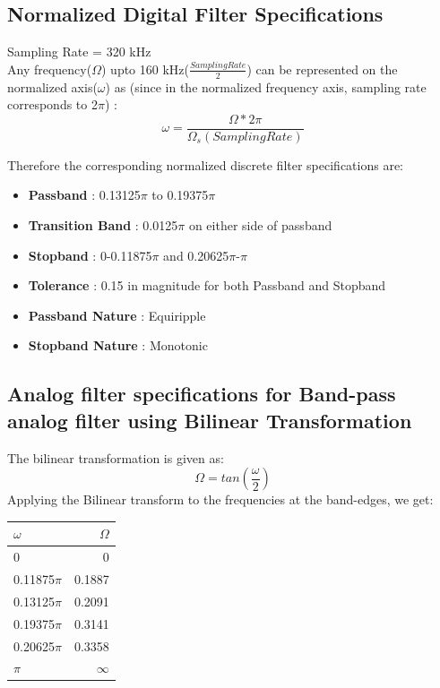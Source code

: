 \documentclass[12pt]{article}
\begin{document}
\subsection{Normalized Digital Filter Specifications}
Sampling Rate = 320 kHz\\
Any frequency($\Omega$) upto 160 kHz($\frac{Sampling Rate}{2}$) can be represented on the normalized axis($\omega$) as (since in the normalized frequency axis, sampling rate 
corresponds to 2$\pi$) :\\
\begin{equation*}
\omega = \frac{\Omega*2\pi}{\Omega _{s}(Sampling Rate)}
\end{equation*}

Therefore the corresponding normalized discrete filter specifications are:
\begin{itemize}
\item \textbf{Passband} : 0.13125$\pi$ to 0.19375$\pi$
\item \textbf{Transition Band} : 0.0125$\pi$ on either side of passband
\item \textbf{Stopband} : 0-0.11875$\pi$ and 0.20625$\pi$-$\pi$
\item \textbf{Tolerance} : 0.15 in magnitude for both Passband and Stopband
\item \textbf{Passband Nature} : Equiripple
\item \textbf{Stopband Nature} : Monotonic
\end{itemize}
\subsection{Analog filter specifications for Band-pass analog filter using Bilinear Transformation}
The bilinear transformation is given as:
\begin{equation*}
\Omega = tan\left(\frac{\omega}{2}\right)
\end{equation*}
Applying the Bilinear transform to the frequencies at the band-edges, we get:
\begin{table}[h!]
\centering
\begin{tabular}{|l|r|}\hline
$\omega$ & $\Omega$ \\\hline
0 & 0 \\
0.11875$\pi$ & 0.1887 \\
0.13125$\pi$ & 0.2091 \\
0.19375$\pi$ & 0.3141 \\
0.20625$\pi$ & 0.3358 \\
$\pi$ & $\infty$\\ \hline
\end{tabular}
\end{table}
\end{document}
